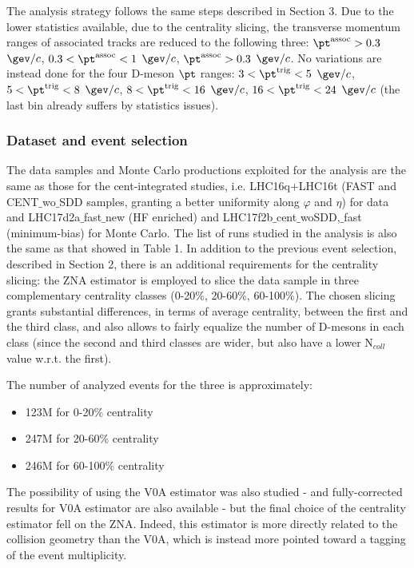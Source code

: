 The analysis strategy follows the same steps described in Section 3. Due to the lower statistics available, due to the centrality slicing, the transverse momentum ranges of associated tracks are reduced to the following three: $\pt^{\rm assoc}>0.3$ $\gev/c$, $0.3<\pt^{\rm assoc}<1$ $\gev/c$, $\pt^{\rm assoc}>0.3$ $\gev/c$. No variations are instead done for the four D-meson $\pt$ ranges: $3<\pt^{\rm trig}<5$ $\gev/c$, $5<\pt^{\rm trig}<8$ $\gev/c$, $8<\pt^{\rm trig}<16$ $\gev/c$, $16<\pt^{\rm trig}<24$ $\gev/c$ (the last bin already suffers by statistics issues).

\subsubsection{Dataset and event selection}
The data samples and Monte Carlo productions exploited for the analysis are the same as those for the cent-integrated studies, i.e. LHC16q$+$LHC16t (FAST and CENT$\_$wo$\_$SDD samples, granting a better uniformity along $\varphi$ and $\eta$) for data and LHC17d2a$\_$fast$\_$new (HF enriched) and LHC17f2b$\_$cent$\_$woSDD,$\_$fast (minimum-bias) for Monte Carlo.
The list of runs studied in the analysis is also the same as that showed in Table 1.
In addition to the previous event selection, described in Section 2, there is an additional requirements for the centrality slicing: the ZNA estimator is employed to slice the data sample in three complementary centrality classes (0-20\%, 20-60\%, 60-100\%). The chosen slicing grants substantial differences, in terms of average centrality, between the first and the third class, and also allows to fairly equalize the number of D-mesons in each class (since the second and third classes are wider, but also have a lower N$_{coll}$ value w.r.t. the first).

The number of analyzed events for the three is approximately:
\begin{itemize}
  \item 123M for 0-20\% centrality
  \item 247M for 20-60\% centrality
  \item 246M for 60-100\% centrality
\end{itemize}

The possibility of using the V0A estimator was also studied - and fully-corrected results for V0A estimator are also available - but the final choice of the centrality estimator fell on the ZNA. Indeed, this estimator is more directly related to the collision geometry than the V0A, which is instead more pointed toward a tagging of the event multiplicity.

